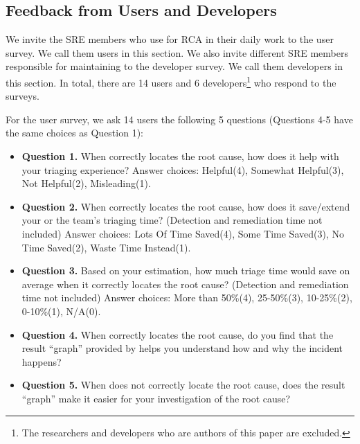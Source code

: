 \subsection{Feedback from \system Users and Developers}

We invite the SRE members who use \system for RCA in their daily work to the user survey. We call them users in this section. We also invite different SRE members responsible for maintaining \system to the developer survey. We call them developers in this section. In total, there are 14 users and 6 developers\footnote{The \system researchers and developers who are authors of this paper are excluded.} who respond to the surveys. 
%

For the user survey, we ask 14 users the following 5 questions (Questions 4-5 have the same choices as Question 1):
\begin{itemize}
    \item \textbf{Question 1.} When \system correctly locates the root cause, how does it help with your triaging experience? Answer choices: Helpful(4), Somewhat Helpful(3), Not Helpful(2), Misleading(1).
    \item \textbf{Question 2.} When \system correctly locates the root cause, how does it save/extend your or the team's triaging time? (Detection and remediation time not included) Answer choices: Lots Of Time Saved(4), Some Time Saved(3), No Time Saved(2), Waste Time Instead(1).
    \item \textbf{Question 3.} Based on your estimation, how much triage time \system would save on average when it correctly locates the root cause? (Detection and remediation time  not included) Answer choices: More than 50\%(4), 25-50\%(3), 10-25\%(2), 0-10\%(1), N/A(0).
    \item \textbf{Question 4.} When \system correctly locates the root cause, do you find that the result ``graph'' provided by \system helps you understand how and why the incident happens?
    \item \textbf{Question 5.} When \system does not correctly locate the root cause, does the result ``graph'' make it easier for your investigation of the root cause?
\end{itemize}


